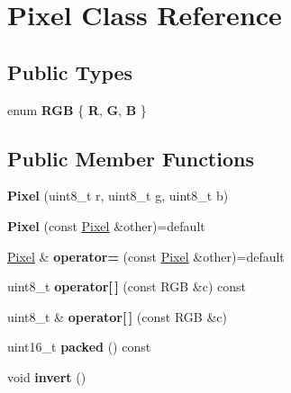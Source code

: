 \hypertarget{class_pixel}{}\section{Pixel Class Reference}
\label{class_pixel}
\subsection*{Public Types}
\begin{DoxyCompactItemize}
\item 
\mbox{\label{class_pixel_ac2ab5194684b31a50d429b26a0569ed9}} 
enum {\bfseries R\+GB} \{ {\bfseries R}, 
{\bfseries G}, 
{\bfseries B}
 \}
\end{DoxyCompactItemize}
\subsection*{Public Member Functions}
\begin{DoxyCompactItemize}
\item 
\mbox{\label{class_pixel_acfc5df218e6b318edcb09cdf6727c529}} 
{\bfseries Pixel} (uint8\+\_\+t r, uint8\+\_\+t g, uint8\+\_\+t b)
\item 
\mbox{\label{class_pixel_a787fa2f52c2c61b3ad51a0ffe80b6a25}} 
{\bfseries Pixel} (const \mbox{\hyperlink{class_pixel}{Pixel}} \&other)=default
\item 
\mbox{\label{class_pixel_ac00753b6afb5bf23405c18f1be0ba7b8}} 
\mbox{\hyperlink{class_pixel}{Pixel}} \& {\bfseries operator=} (const \mbox{\hyperlink{class_pixel}{Pixel}} \&other)=default
\item 
\mbox{\label{class_pixel_a567af5d1018e23555f2a27885f2cb5ca}} 
uint8\+\_\+t {\bfseries operator\mbox{[}$\,$\mbox{]}} (const R\+GB \&c) const
\item 
\mbox{\label{class_pixel_aee26e313f33828aad54775818acb7f4e}} 
uint8\+\_\+t \& {\bfseries operator\mbox{[}$\,$\mbox{]}} (const R\+GB \&c)
\item 
\mbox{\label{class_pixel_ab132854e665ea7526cfd4ecca1654d2b}} 
uint16\+\_\+t {\bfseries packed} () const
\item 
\mbox{\label{class_pixel_a1159eae28181f9bd41ac10833122a7d2}} 
void {\bfseries invert} ()
\end{DoxyCompactItemize}

